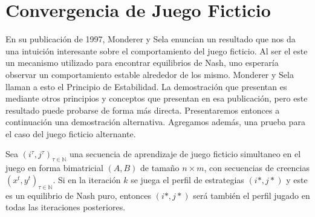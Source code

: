 \section{Convergencia de Juego Ficticio} \label{sec:convergencia:fp}

En su publicación de 1997, Monderer y Sela \cite{no:cycling} enuncian un resultado que nos da una intuición interesante sobre el comportamiento del juego ficticio. Al ser el este un mecanismo utilizado para encontrar equilibrios de Nash, uno esperaría observar un comportamiento estable alrededor de los mismo. Monderer y Sela llaman a esto el Principio de Estabilidad. La demostración que presentan es mediante otros principios y conceptos que presentan en esa publicación, pero este resultado puede probarse de forma más directa. Presentaremos entonces a continuación una demostración alternativa. Agregamos además, una prueba para el caso del juego ficticio alternante.

\begin{theorem}
    Sea $(i^\tau, j^\tau)_{\tau \in \mathbb{N}}$ una secuencia de aprendizaje de juego ficticio simultaneo en el juego en forma bimatricial $(A, B)$ de tamaño $n \times m$, con secuencias de creencias $(x^t, y^t)_{\tau \in \mathbb{N}}$. Si en la iteración $k$ se juega el perfil de estrategias $(i*, j*)$ y este es un equilibrio de Nash puro, entonces $(i*, j*)$ será también el perfil jugado en todas las iteraciones posteriores.
\end{theorem}

